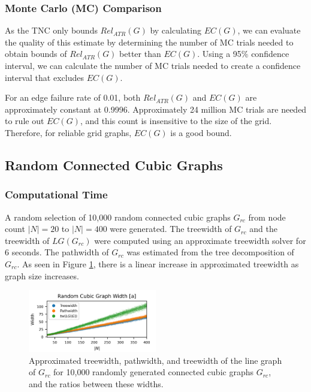 \hypertarget{monte-carlo-mc-comparison}{%
\subsubsection{Monte Carlo (MC) Comparison}\label{monte-carlo-mc-comparison}}

As the TNC only bounds \(Rel_{ATR}(G)\) by calculating \(EC(G)\), we can evaluate the quality of this estimate by determining the number of MC trials needed to obtain bounds of \(Rel_{ATR}(G)\) better than \(EC(G)\). Using a 95\% confidence interval, we can calculate the number of MC trials needed to create a confidence interval that excludes \(EC(G)\).

For an edge failure rate of 0.01, both \(Rel_{ATR}(G)\) and \(EC(G)\) are approximately constant at 0.9996. Approximately 24 million MC trials are needed to rule out \(EC(G)\), and this count is insensitive to the size of the grid. Therefore, for reliable grid graphs, \(EC(G)\) is a good bound.

\hypertarget{random-connected-cubic-graphs}{%
\subsection{Random Connected Cubic Graphs}\label{random-connected-cubic-graphs}}

\hypertarget{computational-time-1}{%
\subsubsection{Computational Time}\label{computational-time-1}}

A random selection of 10,000 random connected cubic graphs \(G_{rc}\) from node count \(|N|=20\) to \(|N|=400\) were generated. The treewidth of \(G_{rc}\) and the treewidth of \(LG(G_{rc})\) were computed using an approximate treewidth solver \cite{dell2018pace} for 6 seconds. The pathwidth of \(G_{rc}\) was estimated from the tree decomposition of \(G_{rc}\). As seen in Figure \ref{fig:Random Cubic Treewidth}, there is a linear increase in approximated treewidth as graph size increases.

\begin{figure}[t]
\caption{Approximated treewidth, pathwidth, and treewidth of the line graph of $G_{rc}$ for 10,000 randomly generated connected cubic graphs $G_{rc}$, and the ratios between these widths.}
\label{fig:Random Cubic Treewidth}
\includegraphics[width=0.5\textwidth]{../figures/RcubicWidth_short.png}
\end{figure}

